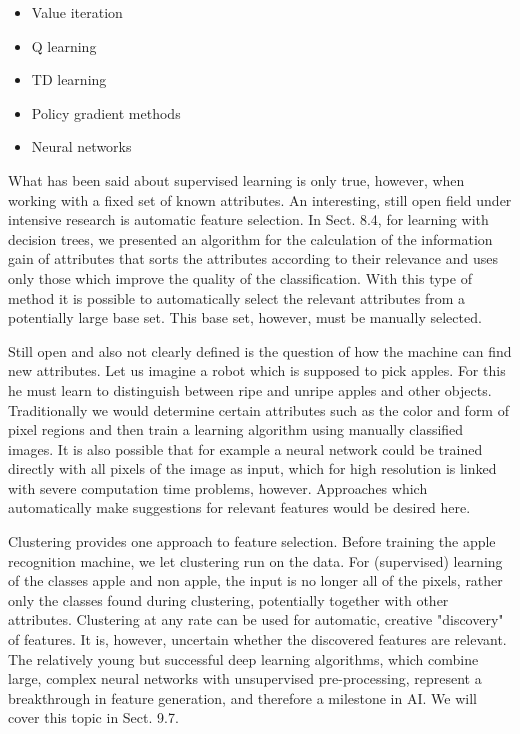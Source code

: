 \documentclass[10pt]{book}
\begin{document}
\begin{center}
\begin{enumerate}
\begin{center}
\begin{center}
\begin{center}
\begin{itemize}
  \item Value iteration
  \item Q learning
  \item TD learning
  \item Policy gradient methods
  \item Neural networks
\end{itemize}

What has been said about supervised learning is only true, however, when working with a fixed set of known attributes. An interesting, still open field under intensive research is automatic feature selection. In Sect. 8.4, for learning with decision trees, we presented an algorithm for the calculation of the information gain of attributes that sorts the attributes according to their relevance and uses only those which improve the quality of the classification. With this type of method it is possible to automatically select the relevant attributes from a potentially large base set. This base set, however, must be manually selected.

Still open and also not clearly defined is the question of how the machine can find new attributes. Let us imagine a robot which is supposed to pick apples. For this he must learn to distinguish between ripe and unripe apples and other objects. Traditionally we would determine certain attributes such as the color and form of pixel regions and then train a learning algorithm using manually classified images. It is also possible that for example a neural network could be trained directly with all pixels of the image as input, which for high resolution is linked with severe computation time problems, however. Approaches which automatically make suggestions for relevant features would be desired here.


Clustering provides one approach to feature selection. Before training the apple recognition machine, we let clustering run on the data. For (supervised) learning of the classes apple and non apple, the input is no longer all of the pixels, rather only the classes found during clustering, potentially together with other attributes. Clustering at any rate can be used for automatic, creative "discovery" of features. It is, however, uncertain whether the discovered features are relevant. The relatively young but successful deep learning algorithms, which combine large, complex neural networks with unsupervised pre-processing, represent a breakthrough in feature generation, and therefore a milestone in AI. We will cover this topic in Sect. 9.7.


\end{center}
\end{center}
\end{center}
\end{enumerate}
\end{center}
\end{document}
